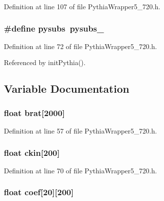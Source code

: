 Definition at line 107 of file Pythia\-Wrapper5\_\-720.h.
\subsubsection{\setlength{\rightskip}{0pt plus 5cm}\#define pysubs~{\bf pysubs\_\-}}\label{PythiaWrapper5__720_8h_c68bb5af2fc4dac62c64cc8cb6e9f767}




Definition at line 72 of file Pythia\-Wrapper5\_\-720.h.

Referenced by init\-Pythia().

\subsection{Variable Documentation}
\subsubsection{\setlength{\rightskip}{0pt plus 5cm}float {\bf brat}[2000]}\label{PythiaWrapper5__720_8h_aa34bc576a44c18edcda75037648976a}




Definition at line 57 of file Pythia\-Wrapper5\_\-720.h.
\subsubsection{\setlength{\rightskip}{0pt plus 5cm}float {\bf ckin}[200]}\label{PythiaWrapper5__720_8h_973d8a9aab8ad847924e1167adc4d4e4}




Definition at line 70 of file Pythia\-Wrapper5\_\-720.h.
\subsubsection{\setlength{\rightskip}{0pt plus 5cm}float {\bf coef}[20][200]}\label{PythiaWrapper5__720_8h_5cb49193b45c4f795e64a3272e828f55}




